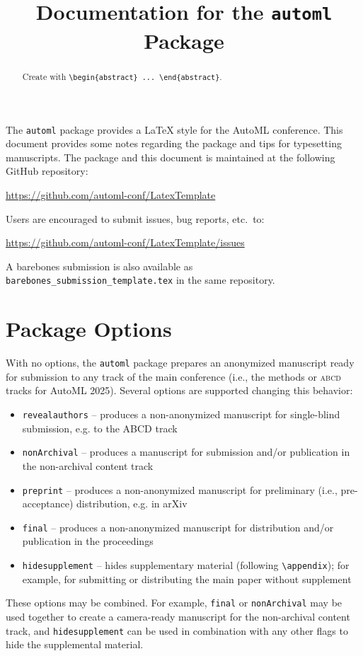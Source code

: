 \documentclass[11pt]{article}
\title{Documentation for the \texttt{automl} Package}
\author[1,$\ast$]{\nameemail{Author 1}{email1@example.com}}
\author[1,2,$\ast$]{\nameemail{Author 2}{email2@example.com}}
\author[2]{\nameemail{Author 3}{email3@example.com}}
\affil[$\ast$]{Equal contribution.}
\affil[1]{Institution 1}
\affil[2]{Institution 2}
\begin{document}
\maketitle

\begin{abstract}
  Create with \verb|\begin{abstract} ... \end{abstract}|.
\end{abstract}

The \texttt{automl} package provides a \LaTeX{} style for the AutoML conference.
This document provides some notes regarding the package and tips for typesetting
manuscripts. The package and this document is maintained at the following GitHub
repository:
\begin{center}
  \url{https://github.com/automl-conf/LatexTemplate}
\end{center}
Users are encouraged to submit issues, bug reports, etc.\ to:
\begin{center}
  \url{https://github.com/automl-conf/LatexTemplate/issues}
\end{center}

A barebones submission is also available as
\texttt{barebones\_submission\_template.tex} in the same repository.

\section{Package Options}

With no options, the \texttt{automl} package prepares an anonymized manuscript
ready for submission to any track of the main conference (i.e., the methods or
\textsc{abcd} tracks for AutoML 2025). Several options are supported changing
this behavior:
\begin{itemize}
\item \texttt{revealauthors} -- produces a non-anonymized manuscript for
  single-blind submission, e.g. to the ABCD track
\item \texttt{nonArchival} -- produces a manuscript for submission and/or
  publication in the non-archival content track
\item \texttt{preprint} -- produces a non-anonymized manuscript for
  preliminary (i.e., pre-acceptance) distribution, e.g. in arXiv
\item \texttt{final} -- produces a non-anonymized manuscript for distribution
  and/or publication in the proceedings
\item \texttt{hidesupplement} -- hides supplementary material (following
  \verb|\appendix|); for example, for submitting or distributing the main paper
  without supplement
\end{itemize}
These options may be combined. For example, \texttt{final} or \texttt{nonArchival}
may be used together to create a camera-ready manuscript for the non-archival content track,
and \texttt{hidesupplement} can be used in combination with any other flags to
hide the supplemental material.
\end{document}
